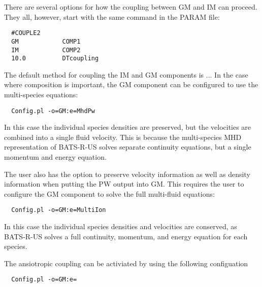 There are several options for how the coupling between GM and IM can proceed. 
They all, however, start with the same command in the PARAM file:
\begin{verbatim}
  #COUPLE2
  GM            COMP1
  IM            COMP2
  10.0          DTcoupling
\end{verbatim}
The default method for coupling the IM and GM components is ...
In the case where composition is important, the GM component can be configured to 
use the multi-species equations:
\begin{verbatim}
  Config.pl -o=GM:e=MhdPw
\end{verbatim}
In this case the individual species densities are preserved, but the 
velocities are combined into a single fluid velocity. This is because the 
multi-species MHD representation of BATS-R-US solves separate continuity 
equations, but a single momentum and energy equation. 

The user also has the option to preserve velocity information as well as 
density information when putting the PW output into GM. This requires the 
user to configure the GM component to solve the full multi-fluid 
equations:
\begin{verbatim}
  Config.pl -o=GM:e=MultiIon
\end{verbatim}
In this case the individual species densities and velocities are conserved, as 
BATS-R-US solves a full continuity, momentum, and energy equation for each 
species.

The ansiotropic coupling can be activiated by using the following configuation
\begin{verbatim}
  Config.pl -o=GM:e=
\end{verbatim}
